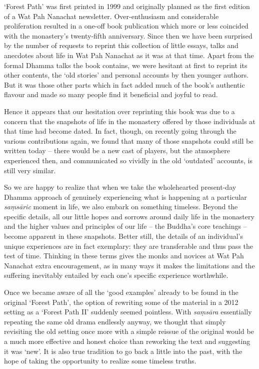 
`Forest Path' was first printed in 1999 and originally planned as the
first edition of a Wat Pah Nanachat newsletter. Over-enthusiasm and
considerable proliferation resulted in a one-off book publication which
more or less coincided with the monastery's twenty-fifth anniversary.
Since then we have been surprised by the number of requests to reprint
this collection of little essays, talks and anecdotes about life in Wat
Pah Nanachat as it was at that time. Apart from the formal Dhamma talks
the book contains, we were hesitant at first to reprint its other
contents, the `old stories' and personal accounts by then younger
authors. But it was those other parts which in fact added much of the
book's authentic flavour and made so many people find it beneficial and
joyful to read.

Hence it appears that our hesitation over reprinting this book was due
to a concern that the snapshots of life in the monastery offered by
those individuals at that time had become dated. In fact, though, on
recently going through the various contributions again, we found that
many of those snapshots could still be written today -- there would be a
new cast of players, but the atmosphere experienced then, and
communicated so vividly in the old `outdated' accounts, is still very
similar.

So we are happy to realize that when we take the wholehearted
present-day Dhamma approach of genuinely experiencing what is happening
at a particular \emph{saṃsāric} moment in life, we also embark on
something timeless. Beyond the specific details, all our little hopes
and sorrows around daily life in the monastery and the higher values and
principles of our life -- the Buddha's core teachings -- become apparent
in these snapshots. Better still, the details of an individual's unique
experiences are in fact exemplary: they are transferable and thus pass
the test of time. Thinking in these terms gives the monks and novices at
Wat Pah Nanachat extra encouragement, as in many ways it makes the
limitations and the suffering inevitably entailed by each one's specific
experience worthwhile.

Once we became aware of all the `good examples' already to be found in
the original `Forest Path', the option of rewriting some of the material
in a 2012 setting as a `Forest Path II' suddenly seemed pointless. With
\emph{saṃsāra} essentially repeating the same old drama endlessly
anyway, we thought that simply revisiting the old setting once more with
a simple reissue of the original would be a much more effective and
honest choice than reworking the text and suggesting it was `new'. It is
also true tradition to go back a little into the past, with the hope of
taking the opportunity to realize some timeless truths.

